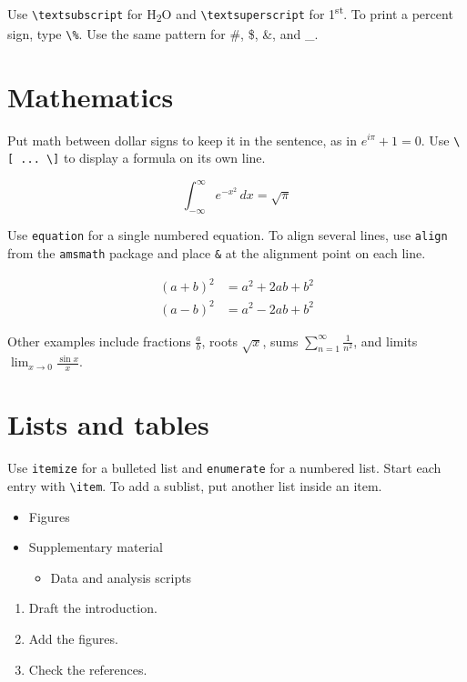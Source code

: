 \documentclass[11pt]{article}
\begin{document}
Use \verb|\textsubscript| for H\textsubscript{2}O and \verb|\textsuperscript| for 1\textsuperscript{st}. To print a percent sign, type \verb|\%|. Use the same pattern for \#, \$, \&, and \_.

\section{Mathematics}

Put math between dollar signs to keep it in the sentence, as in $e^{i\pi} + 1 = 0$. Use \verb|\[ ... \]| to display a formula on its own line.

\[
  \int_{-\infty}^{\infty} e^{-x^2}\,dx = \sqrt{\pi}
\]

Use \verb|equation| for a single numbered equation. To align several lines, use \verb|align| from the \verb|amsmath| package and place \verb|&| at the alignment point on each line.

\begin{align}
  (a + b)^2 &= a^2 + 2ab + b^2 \\
  (a - b)^2 &= a^2 - 2ab + b^2
\end{align}

Other examples include fractions $\frac{a}{b}$, roots $\sqrt{x}$, sums $\sum_{n=1}^{\infty} \frac{1}{n^2}$, and limits $\lim_{x \to 0} \frac{\sin x}{x}$.

\section{Lists and tables}

Use \verb|itemize| for a bulleted list and \verb|enumerate| for a numbered list. Start each entry with \verb|\item|. To add a sublist, put another list inside an item.

\begin{itemize}
  \item Figures
  \item Supplementary material
  \begin{itemize}
    \item Data and analysis scripts
  \end{itemize}
\end{itemize}

\begin{enumerate}
  \item Draft the introduction.
  \item Add the figures.
  \item Check the references.
\end{enumerate}
\end{document}
